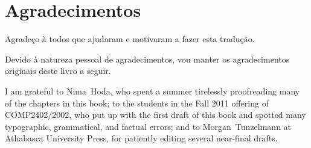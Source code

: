 \chapter*{Agradecimentos}

Agradeço à todos que ajudaram e motivaram a fazer esta tradução. 

Devido à natureza pessoal de agradecimentos, vou manter os agradecimentos originais deste 
livro a seguir.

I am grateful to Nima~Hoda, who spent a summer tirelessly proofreading
many of the chapters in this book; to the students in the Fall 2011
offering of COMP2402/2002, who put up with the first draft of this book
and spotted many typographic, grammatical, and factual errors; and to
Morgan~Tunzelmann at Athabasca University Press, for patiently editing
several near-final drafts.
